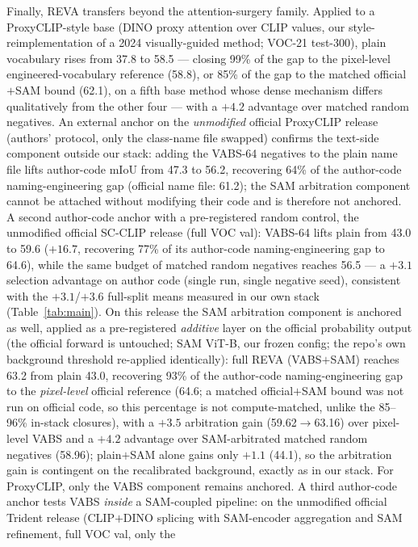 \documentclass[11pt]{article}
\newcommand{\miou}{mIoU}
\newcommand{\reva}{REVA}
\begin{document}
Finally, REVA transfers beyond the attention-surgery family. Applied to a
ProxyCLIP-style base (DINO proxy attention over CLIP values, our
style-reimplementation of a 2024 visually-guided method; VOC-21 test-300), plain
vocabulary rises from 37.8 to 58.5 --- closing 99\% of the gap to the
pixel-level engineered-vocabulary reference (58.8), or 85\% of the gap to the
matched official$+$SAM bound (62.1), on a fifth base method whose dense
mechanism differs qualitatively from the other four --- with a $+4.2$ advantage
over matched random negatives. An external anchor on the \emph{unmodified} official ProxyCLIP release
(authors' protocol, only the class-name file swapped) confirms the text-side
component outside our stack: adding the VABS-64 negatives to the plain name
file lifts author-code \miou{} from 47.3 to 56.2, recovering 64\% of the
author-code naming-engineering gap (official name file: 61.2); the SAM
arbitration component cannot be attached without modifying their code and is
therefore not anchored. A second author-code anchor with a pre-registered
random control, the unmodified official SC-CLIP release (full VOC val):
VABS-64 lifts plain from 43.0 to 59.6 ($+16.7$, recovering 77\% of its
author-code naming-engineering gap to 64.6), while the same budget of matched
random negatives reaches 56.5 --- a $+3.1$ selection advantage on author code
(single run, single negative seed), consistent with the $+3.1$/$+3.6$
full-split means measured in our own stack (Table~\ref{tab:main}). On this
release the SAM arbitration component is anchored as well, applied as a
pre-registered \emph{additive} layer on the official probability output
(the official forward is untouched; SAM ViT-B, our frozen config; the
repo's own background threshold re-applied identically): full \reva{}
(VABS$+$SAM) reaches 63.2 from plain 43.0, recovering 93\% of the
author-code naming-engineering gap to the \emph{pixel-level} official
reference (64.6; a matched official$+$SAM bound was not run on official
code, so this percentage is not compute-matched, unlike the 85--96\%
in-stack closures), with a $+3.5$ arbitration gain (59.62$\to$63.16) over
pixel-level VABS and a $+4.2$ advantage over SAM-arbitrated matched random
negatives (58.96); plain$+$SAM alone gains only $+1.1$ (44.1), so the
arbitration gain is contingent on the recalibrated background, exactly as
in our stack. For ProxyCLIP, only the VABS component remains anchored. A
third author-code anchor tests VABS \emph{inside} a SAM-coupled pipeline:
on the unmodified official Trident release (CLIP$+$DINO splicing with
SAM-encoder aggregation and SAM refinement, full VOC val, only the
\end{document}
